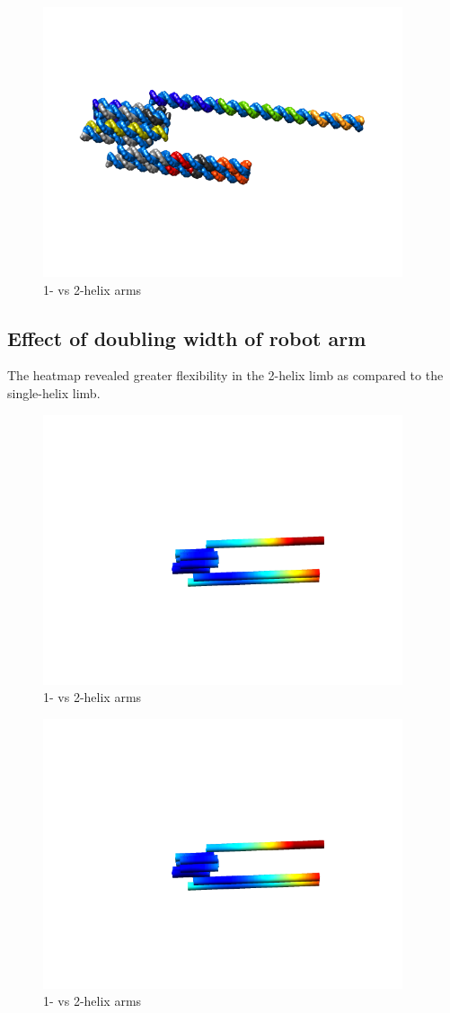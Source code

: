 \documentclass{article}
\begin{document}
\begin{figure}
\includegraphics[width=300pt]{short_atomic}
\caption{1- vs 2-helix arms}
  \label{fig:short_atomic}
\end{figure}


\subsection{Effect of doubling width of robot arm}
The heatmap revealed greater flexibility in the 2-helix limb as compared to the single-helix limb. 
\begin{figure}
    \includegraphics[width=300pt]{single_arm_vs_double_heat}
  \caption{1- vs 2-helix arms}
  \label{fig:single_arm}
\end{figure}

\begin{figure}
\includegraphics[width=300pt]{single_arm_vs_double_heat}
\caption{1- vs 2-helix arms}
  \label{fig:single_arm2}
\end{figure}
\end{document}
